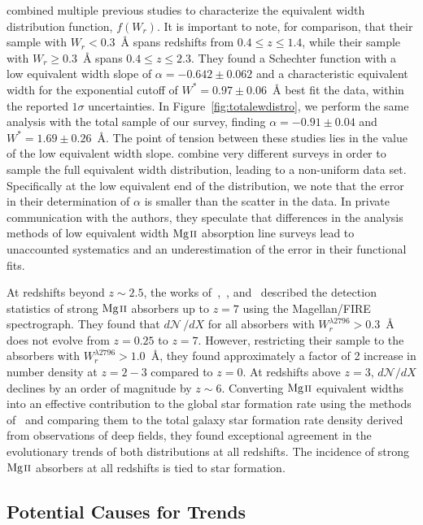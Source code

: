 \documentclass[iop,apj,numberedappendix,appendixfloats,twocolappendix]{emulateapj}
\begin{document}
\cite{Kacprzak2011MgII} combined multiple previous studies to characterize the equivalent width distribution function, $f(W_r)$. It is important to note, for comparison, that their sample with $W_r < 0.3$~{\AA} spans redshifts from $0.4 \le z \le 1.4$, while their sample with $W_r \ge 0.3$~{\AA} spans $0.4 \le z \le 2.3$. They found a Schechter function with a low equivalent width slope of $\alpha = -0.642 \pm 0.062$ and a characteristic equivalent width for the exponential cutoff of $W^* = 0.97 \pm 0.06$~{\AA} best fit the data, within the reported $1\sigma$ uncertainties. In Figure~\ref{fig:totalewdistro}, we perform the same analysis with the total sample of our survey, finding $\alpha = -0.91 \pm 0.04$ and $W^* = 1.69 \pm 0.26$~{\AA}. The point of tension between these studies lies in the value of the low equivalent width slope. \cite{Kacprzak2011MgII} combine very different surveys in order to sample the full equivalent width distribution, leading to a non-uniform data set. Specifically at the low equivalent end of the distribution, we note that the error in their determination of $\alpha$ is smaller than the scatter in the data. In private communication with the authors, they speculate that differences in the analysis methods of low equivalent width ${\hbox{{\rm Mg}\kern 0.1em{\sc ii}}}$ absorption line surveys lead to unaccounted systematics and an underestimation of the error in their functional fits.

At redshifts beyond $z \sim 2.5$, the works of~\cite{Matejek2012},~\cite{Matejek2013}, and~\cite{Chen2016} described the detection statistics of strong ${\hbox{{\rm Mg}\kern 0.1em{\sc ii}}}$ absorbers up to $z = 7$ using the Magellan/FIRE spectrograph. They found that $d\mathcal{N}\,/dX$ for all absorbers with $W_r^{\lambda2796} > 0.3$~{\AA} does not evolve from $z = 0.25$ to $z = 7$. However, restricting their sample to the absorbers with $W_r^{\lambda2796} > 1.0$~{\AA}, they found approximately a factor of 2 increase in number density at $z = 2-3$ compared to $z = 0$. At redshifts above $z = 3$, $d\mathcal{N}\!/dX$ declines by an order of magnitude by $z \sim 6$. Converting ${\hbox{{\rm Mg}\kern 0.1em{\sc ii}}}$ equivalent widths into an effective contribution to the global star formation rate using the methods of~\cite{Menard2011} and comparing them to the total galaxy star formation rate density derived from observations of deep fields, they found exceptional agreement in the evolutionary trends of both distributions at all redshifts. The incidence of strong ${\hbox{{\rm Mg}\kern 0.1em{\sc ii}}}$ absorbers at all redshifts is tied to star formation.

\subsection{Potential Causes for Trends}
\label{sec:trendcauses}
\end{document}
